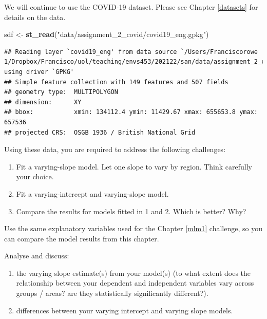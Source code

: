 \documentclass[
]{book}
\newenvironment{Shaded}{\begin{snugshade}}{\end{snugshade}}
\newcommand{\KeywordTok}[1]{\textcolor[rgb]{0.13,0.29,0.53}{\textbf{#1}}}
\newcommand{\NormalTok}[1]{#1}
\newcommand{\StringTok}[1]{\textcolor[rgb]{0.31,0.60,0.02}{#1}}
\providecommand{\tightlist}{%
  \setlength{\itemsep}{0pt}\setlength{\parskip}{0pt}}
\begin{document}
We will continue to use the COVID-19 dataset. Please see Chapter \ref{datasets} for details on the data.

\begin{Shaded}
\begin{Highlighting}[]
\NormalTok{sdf <-}\StringTok{ }\KeywordTok{st_read}\NormalTok{(}\StringTok{"data/assignment_2_covid/covid19_eng.gpkg"}\NormalTok{)}
\end{Highlighting}
\end{Shaded}

\begin{verbatim}
## Reading layer `covid19_eng' from data source `/Users/Franciscorowe 1/Dropbox/Francisco/uol/teaching/envs453/202122/san/data/assignment_2_covid/covid19_eng.gpkg' using driver `GPKG'
## Simple feature collection with 149 features and 507 fields
## geometry type:  MULTIPOLYGON
## dimension:      XY
## bbox:           xmin: 134112.4 ymin: 11429.67 xmax: 655653.8 ymax: 657536
## projected CRS:  OSGB 1936 / British National Grid
\end{verbatim}

Using these data, you are required to address the following challenges:

\begin{enumerate}
\def\labelenumi{\arabic{enumi}.}
\item
  Fit a varying-slope model. Let one slope to vary by region. Think carefully your choice.
\item
  Fit a varying-intercept and varying-slope model.
\item
  Compare the results for models fitted in 1 and 2. Which is better? Why?
\end{enumerate}

Use the same explanatory variables used for the Chapter \ref{mlm1} challenge, so you can compare the model results from this chapter.

Analyse and discuss:

\begin{enumerate}
\def\labelenumi{\arabic{enumi}.}
\tightlist
\item
  the varying slope estimate(s) from your model(s) (to what extent does the relationship between your
  dependent and independent variables vary across groups / areas? are they statistically significantly
  different?).
\item
  differences between your varying intercept and varying slope models.
\end{enumerate}
\end{document}
